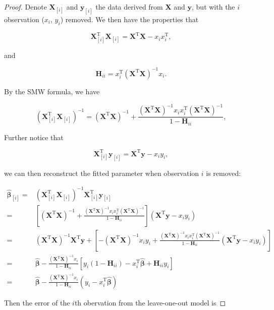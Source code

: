 \documentclass[
]{book}
\theoremstyle{definition}
\theoremstyle{definition}
\theoremstyle{definition}
\theoremstyle{definition}
\theoremstyle{remark}
\begin{document}
\begin{proof}
Denote \(\mathbf{X}_{[i]}\) and \(\mathbf{y}_{[i]}\) the data derived from \(\mathbf{X}\) and \(\mathbf{y}\), but with the \(i\) observation (\(x_i\), \(y_i\)) removed. We then have the properties that

\[\mathbf{X}_{[i]}^\text{T}\mathbf{X}_{[i]} = \mathbf{X}^\text{T}\mathbf{X}- x_i x_i^\text{T}, \]

and

\[\mathbf{H}_{ii} = x_i^\text{T}(\mathbf{X}^\text{T}\mathbf{X})^{-1} x_i.\]

By the SMW formula, we have

\[(\mathbf{X}_{[i]}^\text{T}\mathbf{X}_{[i]})^{-1} = (\mathbf{X}^\text{T}\mathbf{X})^{-1} + \frac{(\mathbf{X}^\text{T}\mathbf{X})^{-1}x_i x_i^\text{T}(\mathbf{X}^\text{T}\mathbf{X})^{-1}}{ 1 - \mathbf{H}_{ii}}, \]

Further notice that

\[\mathbf{X}_{[i]}^\text{T}\mathbf{y}_{[i]} = \mathbf{X}^\text{T}\mathbf{y}- x_i y_i, \]

we can then reconstruct the fitted parameter when observation \(i\) is removed:

\begin{align}
\widehat{\boldsymbol \beta}_{[i]} =& (\mathbf{X}_{[i]}^\text{T}\mathbf{X}_{[i]})^{-1} \mathbf{X}_{[i]}^\text{T}\mathbf{y}_{[i]} \\
=& \left[ (\mathbf{X}^\text{T}\mathbf{X})^{-1} + \frac{(\mathbf{X}^\text{T}\mathbf{X})^{-1}x_i x_i^\text{T}(\mathbf{X}^\text{T}\mathbf{X})^{-1}}{ 1 - \mathbf{H}_{ii}} \right] (\mathbf{X}^\text{T}\mathbf{y}- x_i y_i)\\
=& (\mathbf{X}^\text{T}\mathbf{X})^{-1} \mathbf{X}^\text{T}\mathbf{y}+ \left[ - (\mathbf{X}^\text{T}\mathbf{X})^{-1} x_i y_i +  \frac{(\mathbf{X}^\text{T}\mathbf{X})^{-1}x_i x_i^\text{T}(\mathbf{X}^\text{T}\mathbf{X})^{-1}}{ 1 - \mathbf{H}_{ii}} (\mathbf{X}^\text{T}\mathbf{y}- x_i y_i) \right] \\
=& \widehat{\boldsymbol \beta} - \frac{(\mathbf{X}^\text{T}\mathbf{X})^{-1} x_i}{1 - \mathbf{H}_{ii}} \left[ y_i (1 - \mathbf{H}_{ii}) - x_i^\text{T}\widehat{\boldsymbol \beta} + \mathbf{H}_{ii} y_i \right]\\
=& \widehat{\boldsymbol \beta} - \frac{(\mathbf{X}^\text{T}\mathbf{X})^{-1} x_i}{1 - \mathbf{H}_{ii}} \left( y_i - x_i^\text{T}\widehat{\boldsymbol \beta} \right)
\end{align}

Then the error of the \(i\)th obervation from the leave-one-out model is


\end{proof}
\end{document}
